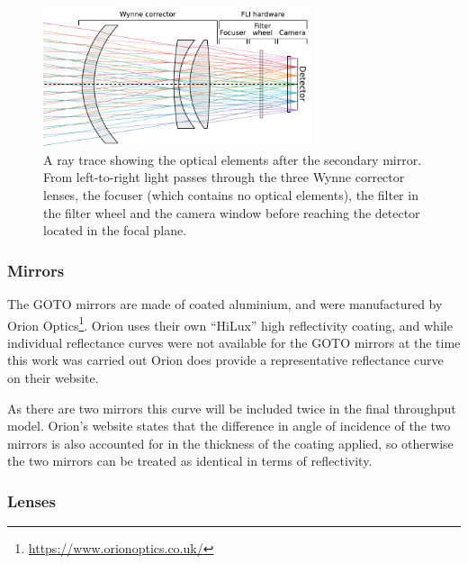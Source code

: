 \begin{colsection}
\begin{colsection}
\begin{figure}[p]
    \begin{center}
        \includegraphics[width=0.7\textwidth]{images/throughput/wynne.pdf}
    \end{center}
    \caption[Ray tracing the corrector elements]{
        A ray trace showing the optical elements after the secondary mirror. From left-to-right light passes through the three Wynne corrector lenses, the focuser (which contains no optical elements), the filter in the filter wheel and the camera window before reaching the detector located in the focal plane.
    }\label{fig:wynne}
\end{figure}

\clearpage

\subsubsection{Mirrors}

The GOTO mirrors are made of coated aluminium, and were manufactured by Orion Optics\footnote{\url{https://www.orionoptics.co.uk/}}. Orion uses their own ``HiLux'' high reflectivity coating, and while individual reflectance curves were not available for the GOTO mirrors at the time this work was carried out Orion does provide a representative reflectance curve on their website.

As there are two mirrors this curve will be included twice in the final throughput model. Orion's website states that the difference in angle of incidence of the two mirrors is also accounted for in the thickness of the coating applied, so otherwise the two mirrors can be treated as identical in terms of reflectivity.

\subsubsection{Lenses}


\end{colsection}
\end{colsection}
